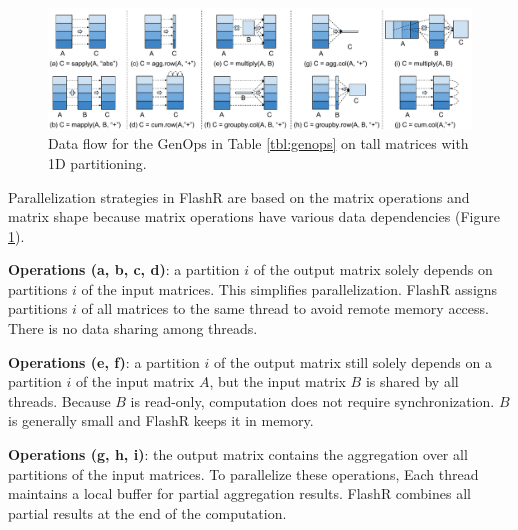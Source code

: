 \begin{figure}
	\centering
	\includegraphics[scale=0.5]{FlashMatrix_figs/Parallelize.pdf}
	\vspace{-4pt}
	\caption{Data flow for the GenOps in Table \ref{tbl:genops} on tall matrices
	 with 1D partitioning.}
	\label{fig:parallel}
  \vspace{-8pt}
\end{figure}

Parallelization strategies in FlashR are based on the matrix operations
and matrix shape because matrix operations have various data dependencies
(Figure \ref{fig:parallel}).

\noindent \textbf{Operations (a, b, c, d)}: a partition $i$ of the output matrix solely depends
		on partitions $i$ of the input matrices. This simplifies
		parallelization. FlashR assigns partitions $i$ of all matrices to
		the same thread to avoid remote memory access. There is no data sharing
		among threads.

\noindent \textbf{Operations (e, f)}: a partition
		$i$ of the output matrix still solely depends on a partition
		$i$ of the input matrix $A$, but the input matrix
		$B$ is shared by all threads. Because $B$ is
		read-only, computation does not require synchronization.
		$B$ is generally small and FlashR keeps it in memory.

\noindent \textbf{Operations (g, h, i)}: the output matrix contains the aggregation
		over all partitions of the input matrices. To parallelize these operations,
		Each thread maintains a local buffer for partial aggregation results.
		FlashR combines all partial results at the end of
		the computation.


